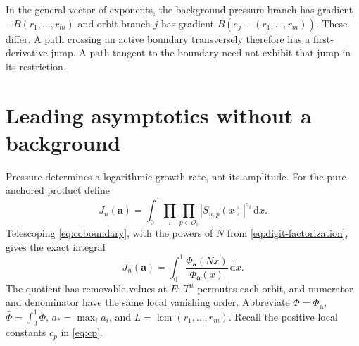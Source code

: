 \documentclass[11pt,a4paper]{article}
\numberwithin{equation}{section}
\theoremstyle{definition}
\theoremstyle{remark}
\newcommand{\dd}{\,\mathrm d}
\newcommand{\cO}{\mathcal O}
\newcommand{\lcm}{\operatorname{lcm}}
\begin{document}
In the general vector of exponents, the background pressure branch has
gradient $-B(r_1,\ldots,r_m)$ and orbit branch $j$ has gradient
$B(e_j-(r_1,\ldots,r_m))$. These differ. A path crossing an active
boundary transversely therefore has a first-derivative jump. A path
tangent to the boundary need not exhibit that jump in its restriction.

\section{Leading asymptotics without a background}
\label{sec:amplitudes}
Pressure determines a logarithmic growth rate, not its amplitude.
For the pure anchored product define
\begin{equation}
 J_n(\boldsymbol a)=\int_0^1
         \prod_i\prod_{p\in\cO_i}|S_{n,p}(x)|^{a_i}\dd x.
 \label{eq:pure-moment}
\end{equation}
Telescoping \cref{eq:coboundary}, with the powers of $N$ from
\cref{eq:digit-factorization}, gives the exact integral
\begin{equation}
 J_n(\boldsymbol a)=\int_0^1
                \frac{\Phi_{\boldsymbol a}(Nx)}{\Phi_{\boldsymbol a}(x)}\dd x.
 \label{eq:telescoping-moment}
\end{equation}
The quotient has removable values at $E$: $T^n$ permutes each orbit,
and numerator and denominator have the same local vanishing order.
Abbreviate $\Phi=\Phi_{\boldsymbol a}$, $\bar\Phi=\int_0^1\Phi$,
$a_* =\max_i a_i$, and $L=\lcm(r_1,\ldots,r_m)$.
Recall the positive local constants $c_p$ in \cref{eq:cp}.
\end{document}

